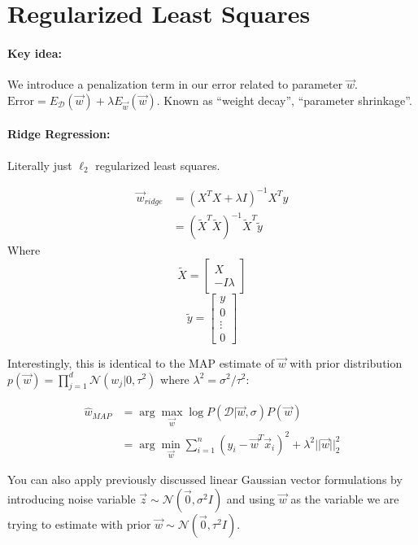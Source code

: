 \documentclass[a4paper,12pt]{report}
\begin{document}
\section{Regularized Least Squares}

\paragraph{Key idea: } We introduce a penalization term in our error related to parameter $\vec w$. $\text{Error} = E_{\mathcal D}(\vec w) + \lambda E_{\vec w}(\vec w)$. Known as ``weight decay'', ``parameter shrinkage''. 

\paragraph{Ridge Regression: } Literally just $\ell_2$ regularized least squares. 

\begin{equation}
\begin{split}
\vec w_{ridge} &= (X^TX + \lambda I )^{-1} X^T y \\
&= (\tilde X^T\tilde X)^{-1} \tilde X^T \tilde y
\end{split}
\end{equation}
Where $$\tilde X = \begin{bmatrix} X\\-I\lambda \end{bmatrix}$$ $$\tilde y = \begin{bmatrix} y\\0\\\vdots\\0 \end{bmatrix}$$



Interestingly, this is identical to the MAP estimate of $\vec w$ with prior distribution $p(\vec w) = \prod_{j=1}^d \mathcal N(w_j | 0, \tau^2)$ where $\lambda^2 = \sigma^2/\tau^2$:

\begin{equation}
\begin{split}
\hat w_{MAP} &= \arg\max_{\vec w} \log P(\mathcal D | \vec w, \sigma)P(\vec w) \\
&= \arg\min_{\vec w} \sum_{i=1}^{n} (y_i - \vec w^T \vec x_i)^2 + \lambda^2 ||\vec w||_2^2
\end{split}
\end{equation}


You can also apply previously discussed linear Gaussian vector formulations by introducing noise variable $\vec z \sim \mathcal N(\vec 0, \sigma^2 I)$ and using $\vec w$ as the variable we are trying to estimate with prior $\vec w \sim \mathcal N (\vec 0, \tau^2 I)$. 
\end{document}
